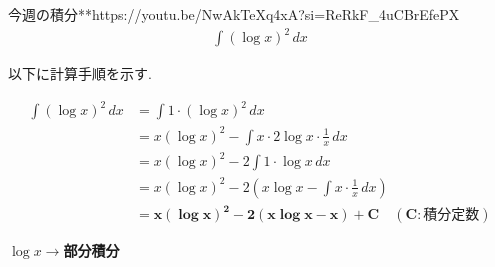\documentclass[main]{subfiles}
\begin{document}

\begin{mondai}{9}{今週の積分}{**}{https://youtu.be/NwAkTeXq4xA?si=ReRkF_4uCBrEfePX}
    \begin{align*}
        \int (\log x)^2 \, dx
    \end{align*}
\end{mondai}


\solutionhead
\hfill
以下に計算手順を示す.
\hfill\

\begin{align*}
\int (\log x)^2 \, dx &= \int 1 \cdot (\log x)^2 \, dx \\
&= x(\log x)^2 - \int x \cdot 2 \log x \cdot \frac{1}{x} \, dx \\
&= x(\log x)^2 - 2 \int 1\cdot \log x \, dx \\
&= x(\log x)^2 - 2 \left( x \log x - \int x \cdot \frac{1}{x} \, dx \right) \\
&= \boldsymbol{x(\log x)^2 - 2(x \log x - x) + C \quad (C:\textbf{積分定数})}
\end{align*}

\begin{focusbox}
\centering
\textbf{$\log x\rightarrow$部分積分}
\end{focusbox}
\end{document}
